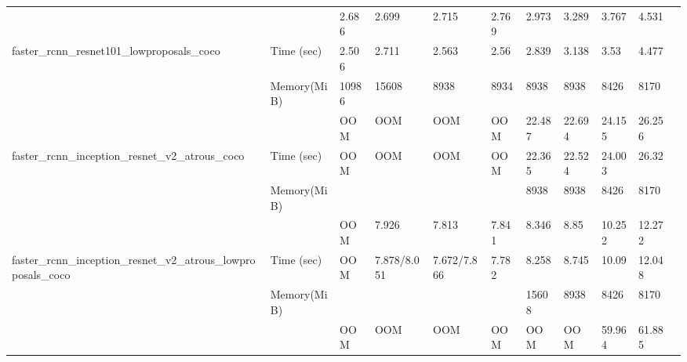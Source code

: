 \documentclass[conference]{IEEEtran}
\begin{document}
\begin{table}[]
{\begin{tabular}{lllllllllll}
                                                                &               & 2.686               & 2.699              & 2.715             & 2.769             & 2.973            & 3.289  & 3.767             & 4.531       &          \\
faster\_rcnn\_resnet101\_lowproposals\_coco                     & Time (sec)    & 2.506               & 2.711              & 2.563             & 2.56              & 2.839            & 3.138  & 3.53              & 4.477       &          \\
                                                                & Memory(MiB)   & 10986               & 15608              & 8938              & 8934              & 8938             & 8938   & 8426              & 8170        &          \\
                                                                &               & OOM                 & OOM                & OOM               & OOM               & 22.487           & 22.694 & 24.155            & 26.256      &          \\
faster\_rcnn\_inception\_resnet\_v2\_atrous\_coco               & Time (sec)    & OOM                 & OOM                & OOM               & OOM               & 22.365           & 22.524 & 24.003            & 26.32       &          \\
                                                                & Memory(MiB)   &                     &                    &                   &                   & 8938             & 8938   & 8426              & 8170        &          \\
                                                                &               & OOM                 & 7.926              & 7.813             & 7.841             & 8.346            & 8.85   & 10.252            & 12.272      &          \\
faster\_rcnn\_inception\_resnet\_v2\_atrous\_lowproposals\_coco & Time (sec)    & OOM                 & 7.878/8.051        & 7.672/7.866       & 7.782             & 8.258            & 8.745  & 10.09             & 12.048      &          \\
                                                                & Memory(MiB)   &                     &                    &                   &                   & 15608            & 8938   & 8426              & 8170        &          \\
                                                                &               & OOM                 & OOM                & OOM               & OOM               & OOM              & OOM    & 59.964            & 61.885      &          \\

\end{tabular}}
\end{table}
\end{document}
